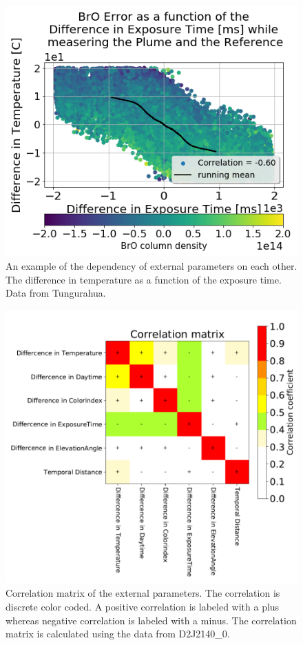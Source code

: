 \documentclass  [
  paper    = a4,
  BCOR     = 10mm,
  twoside,
  fontsize = 12pt,
  fleqn,
  toc      = bibnumbered,
  toc      = listofnumbered,
  numbers  = noendperiod,
  headings = normal,
  listof   = leveldown,
  version  = 3.03
]                                       {scrreprt}
\begin{document}
\begin{figure}[h!]
	\centering
	\includegraphics[width=0.7\linewidth]{"Bilder/Difference in Exposure Time [ms]_Difference in Temperature [C]_Tungu"}
	\caption{An example of the dependency of external parameters on each other. The difference in temperature as a function of the exposure time. Data from Tungurahua.}
	\label{fig:difference-in-exposure-time-msdifference-in-temperature-ctungu}
\end{figure}
\begin{figure}[h!]
	\centering
	\includegraphics[width=1\linewidth]{Bilder/varCorrelation_matrix}
	\caption[Correlation matrix of the external parameters using the data from D2J2140\_0.]{Correlation matrix of the external parameters. The correlation is discrete color coded. A positive correlation is labeled with a plus whereas negative correlation is labeled with a minus. The correlation matrix is calculated using the data from D2J2140\_0.}
	\label{fig:varcorrelationmatrix}
\end{figure}
\end{document}
